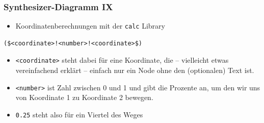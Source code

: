 \documentclass[14pt,ngerman]{beamer}
\begin{document}
\begin{frame}[containsverbatim]
\frametitle{Synthesizer-Diagramm IX}

\begin{itemize}
\item Koordinatenberechnungen mit der \texttt{calc} Library
\end{itemize}

\begin{lstlisting}
($<coordinate>!<number>!<coordinate>$)
\end{lstlisting}

\begin{itemize}
	\item \texttt{<coordinate>} steht dabei für eine Koordinate, die -- vielleicht etwas vereinfachend erklärt -- einfach nur ein Node ohne den (optionalen) Text ist.
	\item  \texttt{<number>} ist Zahl zwischen 0 und 1 und gibt die Prozente an, um den wir uns von Koordinate 1 zu Koordinate 2 bewegen. 
	\item  \texttt{0.25} steht also für ein Viertel des Weges 
\end{itemize}


\end{frame}
\end{document}
